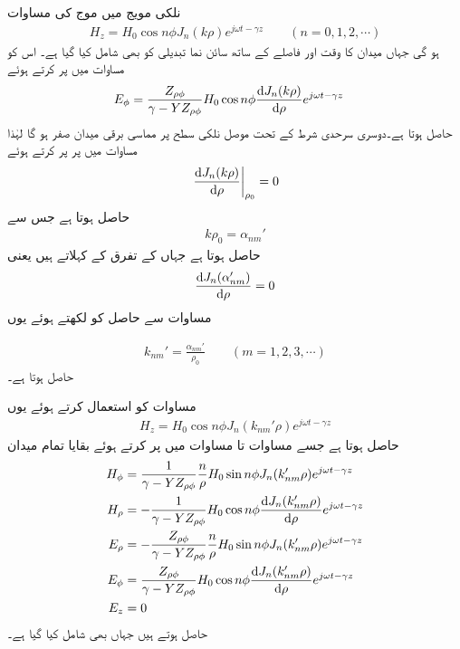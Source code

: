 نلکی مویج میں موج کی مساوات
\begin{align}\label{مساوات_مویج_نلکی_حل_پ}
H_z=H_0  \cos n \phi  J_n(k \rho) e^{j\omega t -\gamma z}  \quad \quad (n=0,1,2,\cdots)
\end{align}
ہو گی جہاں میدان کا وقت اور فاصلے کے ساتھ سائن نما تبدیلی کو بھی شامل کیا گیا ہے۔ اس کو مساوات  میں پر کرتے ہوئے 
\begin{align}
E_{\phi}&=\frac{Z_{\rho \phi}}{\gamma-YZ_{\rho \phi}}H_0  \cos n \phi  \frac{\dif J_n(k \rho)}{\dif \rho} e^{j\omega t -\gamma z}\label{مساوات_مویج_حل_تقریباً_مکمل}
\end{align}
حاصل ہوتا ہے۔دوسری سرحدی  شرط کے تحت موصل نلکی سطح پر مماسی  برقی میدان صفر ہو گا لہٰذا  مساوات  میں  پر  پر کرتے ہوئے
\begin{align}
 \left. \frac{\dif J_n(k \rho)}{\dif \rho}\right|_{\rho_0}=0
\end{align}
حاصل ہوتا ہے جس سے
\begin{align}\label{مساوات_مویج_مستقل_بمطابق_شرط_الف}
k \rho_0=\alpha_{nm}'
\end{align}
حاصل ہوتا ہے جہاں   کے تفرق کے   کہلاتے ہیں یعنی
\begin{align}
 \frac{\dif  J_n(\alpha_{nm}')}{\dif \rho}=0
\end{align}
مساوات  سے حاصل  کو  لکھتے ہوئے یوں


\begin{align}\label{مساوات_مویج_مستقل_بمطابق_شرط}
k_{nm}'=\frac{\alpha_{nm}'}{\rho_0} \quad \quad (m=1,2,3,\cdots)
\end{align}
حاصل ہوتا ہے۔ 

مساوات  کو استعمال کرتے ہوئے یوں
 \begin{align}\label{مساوات_مویج_نلکی_حل_ت}
H_z=H_0  \cos n \phi  J_n(k_{nm}'\rho) e^{j\omega t -\gamma z} 
\end{align} 
حاصل ہوتا ہے جسے  مساوات  تا مساوات  میں پر کرتے ہوئے بقایا تمام میدان
\begin{align}
H_{\phi}&=\frac{1}{\gamma-YZ_{\rho \phi}} \frac{n}{\rho} H_0 \sin n\phi J_n(k_{nm}'\rho)e^{j\omega t-\gamma z}  \\
H_{\rho}&=-\frac{1}{\gamma-YZ_{\rho \phi}}H_0  \cos n \phi \frac{\dif  J_n(k_{nm}' \rho)}{\dif \rho} e^{j\omega t -\gamma z} \\
E_{\rho}&=-\frac{Z_{\rho \phi}}{\gamma-YZ_{\rho \phi}} \frac{n}{\rho}H_0  \sin n \phi  J_n(k_{nm}' \rho) e^{j\omega t -\gamma z}\\
E_{\phi}&=\frac{Z_{\rho \phi}}{\gamma-YZ_{\rho \phi}}H_0  \cos n \phi  \frac{\dif J_n(k_{nm}' \rho)}{\dif \rho} e^{j\omega t -\gamma z}\\
E_z&=0
\end{align}
حاصل ہوتے ہیں جہاں  بھی شامل کیا گیا ہے۔

